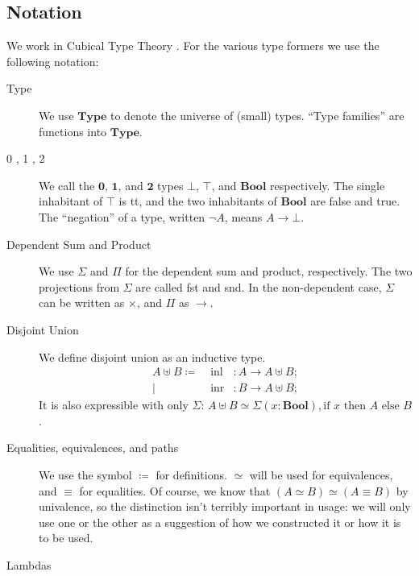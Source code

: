 \subsection{Notation}
We work in Cubical Type Theory \cite{cohenCubicalTypeTheory2016}.
For the various type formers we use the following notation:
\begin{description}
  \item[Type] We use \(\mathbf{Type}\) to denote the universe of (small) types.
    ``Type families'' are functions into \(\mathbf{Type}\).
  \item[0 , 1 , 2] We call the \(\mathbf{0}\), \(\mathbf{1}\), and
    \(\mathbf{2}\) types \(\bot\), \(\top\), and \(\mathbf{Bool}\) respectively.
    The single inhabitant of \(\top\) is tt, and the two inhabitants of
    \(\mathbf{Bool}\) are false and true.
    The ``negation'' of a type, written \(\neg A\), means \(A \rightarrow
    \bot\).
  \item[Dependent Sum and Product] We use \(\Sigma\) and \(\Pi\) for the
    dependent sum and product, respectively.
    The two projections from \(\Sigma\) are called fst and snd.
    In the non-dependent case, \(\Sigma\) can be written as \(\times\), and
    \(\Pi\) as \(\rightarrow\).
  \item[Disjoint Union] We define disjoint union as an inductive type.
    \begin{equation}
      \begin{alignedat}{3}
        A \uplus B \coloneqq & \;
        \text{inl} &: A \rightarrow A \uplus B ; \\
        | & \;  \text{inr} &: B \rightarrow A \uplus B ;
      \end{alignedat}
    \end{equation}
    It is also expressible with only \(\Sigma\):
    \(A \uplus B \simeq \Sigma(x : \mathbf{Bool}) , \text{if } x \text{ then
    } A \text{ else } B \).
  \item[Equalities, equivalences, and paths] We use the symbol \(\coloneqq\)
    for definitions.
    \(\simeq\) will be used for equivalences, and \(\equiv\) for equalities.
    Of course, we know that \((A \simeq B) \simeq (A \equiv B)\) by univalence,
    so the distinction isn't terribly important in usage: we will only use one
    or the other as a suggestion of how we constructed it or how it is to be
    used.
  \item[Lambdas] 
\end{description}
